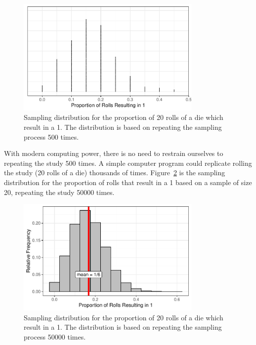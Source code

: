 \documentclass[
  letterpaper,
  DIV=11,
  numbers=noendperiod]{scrreprt}
\theoremstyle{definition}
\theoremstyle{definition}
\theoremstyle{plain}
\theoremstyle{remark}
\begin{document}
\begin{figure}

{\centering \includegraphics[width=0.8\textwidth,height=\textheight]{./images/fig-samplingdistns-dice-dotplot-1.pdf}

}

\caption{\label{fig-samplingdistns-dice-dotplot}Sampling distribution
for the proportion of 20 rolls of a die which result in a 1. The
distribution is based on repeating the sampling process 500 times.}

\end{figure}

With modern computing power, there is no need to restrain ourselves to
repeating the study 500 times. A simple computer program could replicate
rolling the study (20 rolls of a die) thousands of times.
Figure~\ref{fig-samplingdistns-dice-histogram} is the sampling
distribution for the proportion of rolls that result in a 1 based on a
sample of size 20, repeating the study 50000 times.

\begin{figure}

{\centering \includegraphics[width=0.8\textwidth,height=\textheight]{./images/fig-samplingdistns-dice-histogram-1.pdf}

}

\caption{\label{fig-samplingdistns-dice-histogram}Sampling distribution
for the proportion of 20 rolls of a die which result in a 1. The
distribution is based on repeating the sampling process 50000 times.}

\end{figure}
\end{document}

